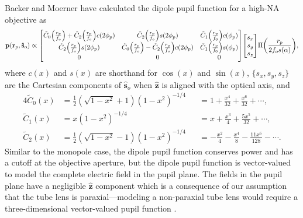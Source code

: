 \documentclass[]{osa-article}
\let\originalleft\left
\let\originalright\right
\renewcommand{\left}{\mathopen{}\mathclose\bgroup\originalleft}
\renewcommand{\right}{\aftergroup\egroup\originalright}
\providecommand{\mb}[1]{\mathbf{#1}}
\providecommand{\so}{\mathbf{\hat{s}}_o}
\providecommand{\rp}{\mathbf{r}_p}
\providecommand{\mh}[1]{\mathbf{\hat{#1}}}
\begin{document}
 Backer and Moerner \cite{backer2014} have calculated the dipole pupil function
 for a high-NA objective as
 \begin{align}
   \mb{p}(\rp, \so) \propto
   \begin{bmatrix}
     \tilde{C}_0\left(\frac{r_p}{f_o}\right) + \tilde{C}_2\left(\frac{r_p}{f_o}\right)c(2\phi_p)&\tilde{C}_2\left(\frac{r_p}{f_o}\right)s(2\phi_p)&\tilde{C}_1\left(\frac{r_p}{f_0}\right)c(\phi_p)\\
     \tilde{C}_2\left(\frac{r_p}{f_o}\right)s(2\phi_p)&\tilde{C}_0\left(\frac{r_p}{f_o}\right) - \tilde{C}_2\left(\frac{r_p}{f_o}\right)c(2\phi_p)&\tilde{C}_1\left(\frac{r_p}{f_0}\right)s(\phi_p)\\     
     0&0&0\\     
   \end{bmatrix}
   \begin{bmatrix}
     s_x\\
     s_y\\
     s_z
   \end{bmatrix}
   \Pi\left(\frac{r_p}{2f_os(\alpha)}\right),
 \end{align}
 where $c(x)$ and $s(x)$ are shorthand for $\cos(x)$ and $\sin(x)$,
 $\{s_x, s_y, s_z\}$ are the Cartesian components of $\so$ when $\mh{z}$ is
 aligned with the optical axis, and
 \begin{alignat}{4}
   \tilde{C}_0(x) &= \frac{1}{2}(\sqrt{1 - x^2} + 1)(1 - x^2)^{-1/4} &&= 1 + \frac{x^4}{32} + \frac{x^6}{32} + \cdots,\\
   \tilde{C}_1(x) &= x(1 - x^2)^{-1/4} &&= x + \frac{x^3}{4} + \frac{5x^5}{32} + \cdots,\\
   \tilde{C}_2(x) &= \frac{1}{2}(\sqrt{1 - x^2} - 1)(1 - x^2)^{-1/4} &&= -\frac{x^2}{4} - \frac{x^4}{8} - \frac{11x^6}{128} - \cdots.
 \end{alignat}
 Similar to the monopole case, the dipole pupil function conserves power and has
 a cutoff at the objective aperture, but the dipole pupil function is
 vector-valued to model the complete electric field in the pupil plane. The
 fields in the pupil plane have a negligible $\mh{z}$ component which is a
 consequence of our assumption that the tube lens is paraxial---modeling a
 non-paraxial tube lens would require a three-dimensional vector-valued pupil
 function \cite{sheppard1994, gu2000, arnison2002, foreman2011-2}. 
\end{document}
